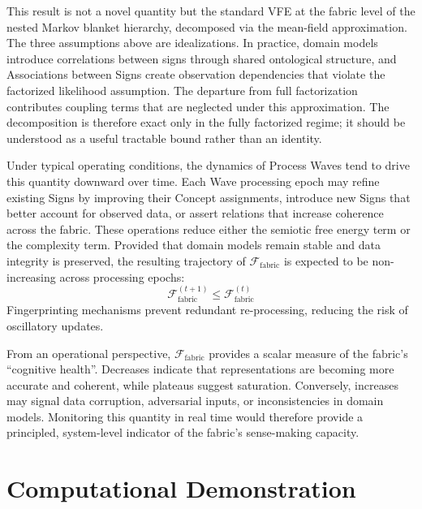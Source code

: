 \documentclass[11pt,a4paper]{article}
\theoremstyle{definition}
\begin{document}
This result is not a novel quantity but the standard VFE at the fabric level of the nested Markov blanket hierarchy, decomposed via the mean-field approximation. The three assumptions above are idealizations. In practice, domain models introduce correlations between signs through shared ontological structure, and Associations between Signs create observation dependencies that violate the factorized likelihood assumption. The departure from full factorization contributes coupling terms that are neglected under this approximation. The decomposition is therefore exact only in the fully factorized regime; it should be understood as a useful tractable bound rather than an identity.

\label{prop:monotone}
Under typical operating conditions, the dynamics of Process Waves tend to drive this quantity downward over time. Each Wave processing epoch may refine existing Signs by improving their Concept assignments, introduce new Signs that better account for observed data, or assert relations that increase coherence across the fabric. These operations reduce either the semiotic free energy term or the complexity term. Provided that domain models remain stable and data integrity is preserved, the resulting trajectory of $\mathcal{F}_{\text{fabric}}$ is expected to be non-increasing across processing epochs:
\begin{equation}
\label{eq:monotone_decrease}
\mathcal{F}_{\text{fabric}}^{(t+1)} \leq \mathcal{F}_{\text{fabric}}^{(t)}
\end{equation}
Fingerprinting mechanisms prevent redundant re-processing, reducing the risk of oscillatory updates.

From an operational perspective, $\mathcal{F}_{\text{fabric}}$ provides a scalar measure of the fabric’s ``cognitive health''. Decreases indicate that representations are becoming more accurate and coherent, while plateaus suggest saturation. Conversely, increases may signal data corruption, adversarial inputs, or inconsistencies in domain models. Monitoring this quantity in real time would therefore provide a principled, system-level indicator of the fabric’s sense-making capacity.

\section{Computational Demonstration}
\label{sec:simulation}
\end{document}
